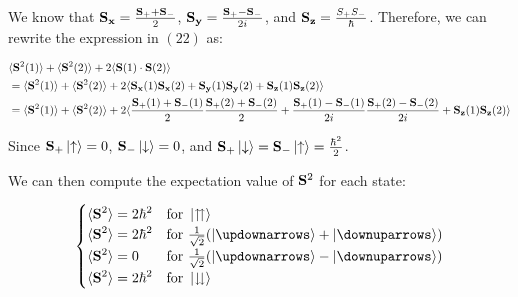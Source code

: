 \documentclass[11pt]{article}
\begin{document}
      We know that $\vb{S_x} = \frac{\vb{S_+} + \vb{S_-}}{2}$, $\vb{S_y} = \frac{\vb{S_+} - \vb{S_-}}{2i}$, and $\vb{S_z} = \frac{S_+S_-}{\hbar}$. 
      Therefore, we can rewrite the expression in $(22)$ as:

      \begin{align*}
        &\langle \vb{S}^2(1) \rangle + \langle \vb{S}^2(2) \rangle + 2\langle \vb{S}(1)\cdot\vb{S}(2) \rangle \\
        &= \langle \vb{S}^2(1) \rangle + \langle \vb{S}^2(2) \rangle + 2\langle \vb{S_x}(1)\vb{S_x}(2) + \vb{S_y}(1)\vb{S_y}(2) + \vb{S_z}(1)\vb{S_z}(2) \rangle \\
        &= \langle \vb{S}^2(1) \rangle + \langle \vb{S}^2(2) \rangle + 2\langle \frac{\vb{S_+}(1) + \vb{S_-}(1)}{2} \frac{\vb{S_+}(2) + \vb{S_-}(2)}{2} + \frac{\vb{S_+}(1) - \vb{S_-}(1)}{2i} \frac{\vb{S_+}(2) - \vb{S_-}(2)}{2i} + \vb{S_z}(1)\vb{S_z}(2) \rangle \\
      \end{align*}

      Since $\vb{S_+}\ket{\uparrow} = 0$, $\vb{S_-}\ket{\downarrow} = 0$, and $\vb{S_+}\ket{\downarrow} = \vb{S_-}\ket{\uparrow} = \frac{\hbar^2}{2}$.

      We can then compute the expectation value of $\vb{S}^2$ for each state:

      \begin{equation}
        \begin{cases}
            \displaystyle
            \langle \vb{S}^2 \rangle = 2\hbar^2 & \text{for } \ket{\upuparrows} \\
            \displaystyle
            \langle \vb{S}^2 \rangle = 2\hbar^2 & \text{for } \frac{1}{\sqrt{2}}(\ket{\updownarrows} + \ket{\downuparrows}) \\
            \displaystyle
            \langle \vb{S}^2 \rangle = 0 & \text{for } \frac{1}{\sqrt{2}}(\ket{\updownarrows} - \ket{\downuparrows}) \\
            \displaystyle
            \langle \vb{S}^2 \rangle = 2\hbar^2 & \text{for } \ket{\downdownarrows} \\
        \end{cases}
      \end{equation}
\end{document}
